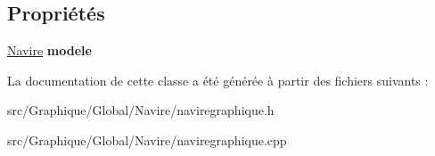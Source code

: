 \subsection*{Propriétés}
\begin{DoxyCompactItemize}
\item 
\hyperlink{class_navire}{Navire} {\bfseries modele}\hypertarget{class_navire_graphique_ad6015761841fe8f6e7d8c72b96d5428e}{}\label{class_navire_graphique_ad6015761841fe8f6e7d8c72b96d5428e}

\end{DoxyCompactItemize}


La documentation de cette classe a été générée à partir des fichiers suivants \+:\begin{DoxyCompactItemize}
\item 
src/\+Graphique/\+Global/\+Navire/naviregraphique.\+h\item 
src/\+Graphique/\+Global/\+Navire/naviregraphique.\+cpp\end{DoxyCompactItemize}
